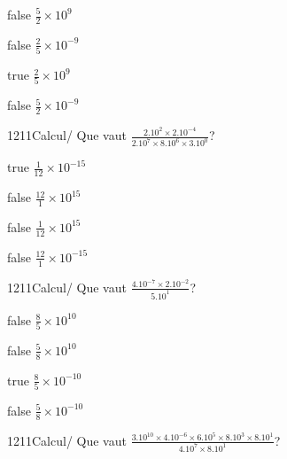 \documentclass[11pt]{article}
\begin{document}
            \begin{reponses}
                \item[false] $\frac{5}{2}\times 10^{9}$
                \item[false] $\frac{2}{5}\times 10^{-9}$
                \item[true] $\frac{2}{5}\times 10^{9}$
                \item[false] $\frac{5}{2}\times 10^{-9}$
            \end{reponses}
            
            \begin{question}{1211}{Calcul}{}{/}
                Que vaut $\frac{2.10^{2}\times 2.10^{-4}}{2.10^{7}\times 8.10^{6}\times 3.10^{0}}$?
            \end{question}
            
            \begin{reponses}
                \item[true] $\frac{1}{12}\times 10^{-15}$
                \item[false] $\frac{12}{1}\times 10^{15}$
                \item[false] $\frac{1}{12}\times 10^{15}$
                \item[false] $\frac{12}{1}\times 10^{-15}$
            \end{reponses}
            
            \begin{question}{1211}{Calcul}{}{/}
                Que vaut $\frac{4.10^{-7}\times 2.10^{-2}}{5.10^{1}}$?
            \end{question}
            
            \begin{reponses}
                \item[false] $\frac{8}{5}\times 10^{10}$
                \item[false] $\frac{5}{8}\times 10^{10}$
                \item[true] $\frac{8}{5}\times 10^{-10}$
                \item[false] $\frac{5}{8}\times 10^{-10}$
            \end{reponses}
            
            \begin{question}{1211}{Calcul}{}{/}
                Que vaut $\frac{3.10^{10}\times 4.10^{-6}\times 6.10^{5}\times 8.10^{3}\times 8.10^{1}}{4.10^{7}\times 8.10^{1}}$?
            \end{question}
            
\end{document}
